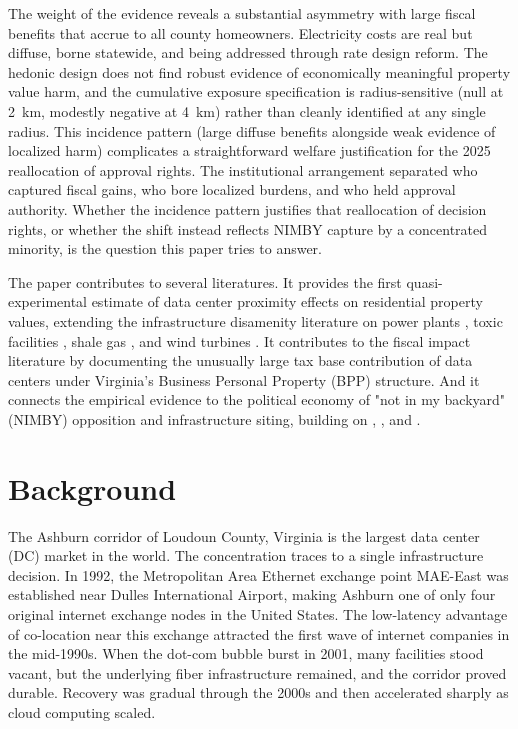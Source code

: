 \documentclass[12pt]{article}
\begin{document}
The weight of the evidence reveals a substantial asymmetry with large fiscal benefits that accrue to all county homeowners. Electricity costs are real but diffuse, borne statewide, and being addressed through rate design reform. The hedonic design does not find robust evidence of economically meaningful property value harm, and the cumulative exposure specification is radius-sensitive (null at 2~km, modestly negative at 4~km) rather than cleanly identified at any single radius. This incidence pattern (large diffuse benefits alongside weak evidence of localized harm) complicates a straightforward welfare justification for the 2025 reallocation of approval rights. The institutional arrangement separated who captured fiscal gains, who bore localized burdens, and who held approval authority. Whether the incidence pattern justifies that reallocation of decision rights, or whether the shift instead reflects NIMBY capture by a concentrated minority, is the question this paper tries to answer.

The paper contributes to several literatures. It provides the first quasi-experimental estimate of data center proximity effects on residential property values, extending the infrastructure disamenity literature on power plants \citep{Davis2011}, toxic facilities \citep{Currie2015}, shale gas \citep{Muehlenbachs2015}, and wind turbines \citep{Gibbons2015, Jarvis2025}. It contributes to the fiscal impact literature \citep{Greenstone2010, Bartik2020, Slattery2020} by documenting the unusually large tax base contribution of data centers under Virginia's Business Personal Property (BPP) structure. And it connects the empirical evidence to the political economy of "not in my backyard" (NIMBY) opposition and infrastructure siting, building on \citet{Olson1965}, \citet{Fischel2001}, and \citet{GlaeserGyourko2018}.

\section{Background}
\label{sec:background}

The Ashburn corridor of Loudoun County, Virginia is the largest data center (DC) market in the world. The concentration traces to a single infrastructure decision. In 1992, the Metropolitan Area Ethernet exchange point MAE-East was established near Dulles International Airport, making Ashburn one of only four original internet exchange nodes in the United States. The low-latency advantage of co-location near this exchange attracted the first wave of internet companies in the mid-1990s. When the dot-com bubble burst in 2001, many facilities stood vacant, but the underlying fiber infrastructure remained, and the corridor proved durable. Recovery was gradual through the 2000s and then accelerated sharply as cloud computing scaled.
\end{document}
